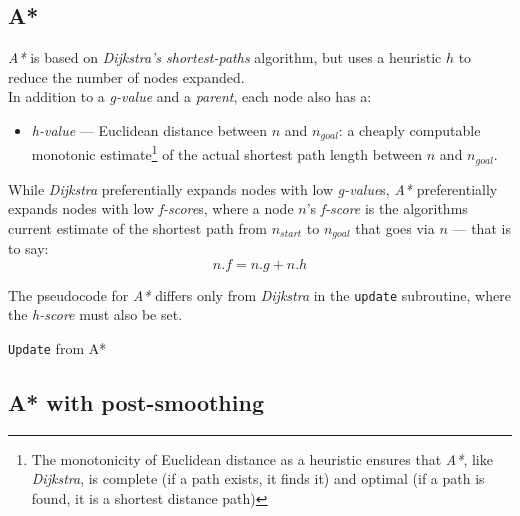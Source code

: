\documentclass[12pt,notitlepage]{report}
\begin{document}
\subsection {A*}

{\em A*} is based on {\em Dijkstra's shortest-paths} algorithm, but uses a heuristic $h$ to reduce the number of nodes expanded.\\

\noindent
In addition to a {\em g-value} and a {\em parent}, each node also has a:
\begin{itemize}
\item {\em h-value} --- Euclidean distance between {$n$} and {$n_{goal}$}: a cheaply computable monotonic estimate\footnote{The monotonicity of Euclidean distance as a heuristic ensures that {\em A*}, like {\em Dijkstra}, is complete (if a path exists, it finds it) and optimal (if a path is found, it is a shortest distance path)} of the actual shortest path length between $n$ and $n_{goal}$.
\end{itemize}

\noindent
While {\em Dijkstra} preferentially expands nodes with low {\em g-value}s, {\em A*} preferentially expands nodes with low {\em f-score}s, where a node $n$'s {\em f-score} is the algorithms current estimate of the shortest path from $n_{start}$ to $n_{goal}$ that goes via $n$ --- that is to say:
\begin{equation}
n.f = n.g + n.h
\end{equation}

\noindent
The pseudocode for {\em A*} differs only from {\em Dijkstra} in the {\tt update} subroutine, where the {\em h-score} must also be set.

\begin{algorithm}
  \SetAlgoLined\DontPrintSemicolon
  \caption{{\tt Update} from {\sc A*}}
\end{algorithm} 

\subsection {A* with post-smoothing}
\end{document}
